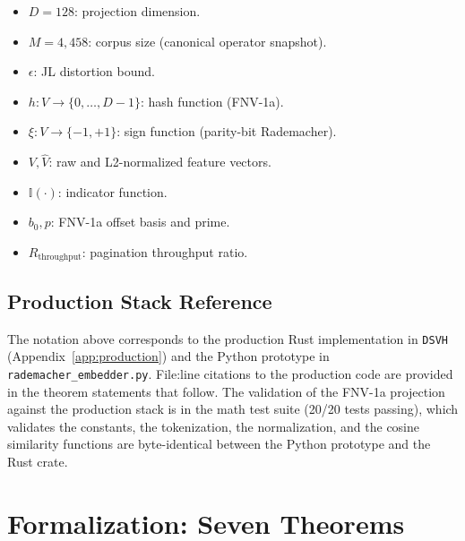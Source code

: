 \documentclass[10pt,twocolumn]{article}
\theoremstyle{definition}
\theoremstyle{remark}
\begin{document}
\begin{itemize}
    \item $D = 128$: projection dimension.
    \item $M = 4{,}458$: corpus size (canonical operator snapshot).
    \item $\epsilon$: JL distortion bound.
    \item $h: V \to \{0, \ldots, D-1\}$: hash function (FNV-1a).
    \item $\xi: V \to \{-1, +1\}$: sign function (parity-bit Rademacher).
    \item $V, \hat{V}$: raw and L2-normalized feature vectors.
    \item $\mathbb{I}(\cdot)$: indicator function.
    \item $b_0, p$: FNV-1a offset basis and prime.
    \item $R_{\text{throughput}}$: pagination throughput ratio.
\end{itemize}

\subsection{Production Stack Reference}

The notation above corresponds to the production Rust implementation
in \texttt{DSVH} (Appendix~\ref{app:production}) and
the Python prototype in \texttt{rademacher\_embedder.py}. File:line
citations to the production code are provided in the theorem statements
that follow. The validation of the FNV-1a projection against the
production stack is in the math test suite (20/20 tests
passing), which validates the constants, the tokenization, the
normalization, and the cosine similarity functions are byte-identical
between the Python prototype and the Rust crate.

\setcounter{section}{4}


\setcounter{section}{5}
\section{Formalization: Seven Theorems}
\label{sec:formalization}
\end{document}
